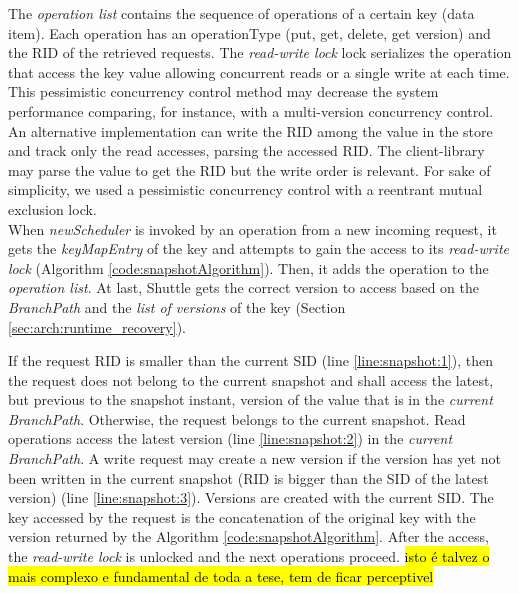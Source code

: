 The \emph{operation list} contains the sequence of operations of a certain key (data item). Each operation has an operationType (put, get, delete, get version) and the \ac{RID} of the retrieved requests. The \emph{read-write lock} lock serializes the operation that access the key value allowing concurrent reads or a single write at each time. This pessimistic concurrency control method may decrease the system performance comparing, for instance, with a multi-version concurrency control. An alternative implementation can write the \ac{RID} among the value in the store and track only the read accesses, parsing the accessed \ac{RID}. The client-library may parse the value to get the \ac{RID} but the write order is relevant. For sake of simplicity, we used a pessimistic concurrency control with a reentrant mutual exclusion lock.\\

When \emph{newScheduler} is invoked by an operation from a new incoming request, it gets the \emph{keyMapEntry} of the key and attempts to gain the access to its \emph{read-write lock} (Algorithm \ref{code:snapshotAlgorithm}). Then, it adds the operation to the \emph{operation list}. At last, Shuttle gets the correct version to access based on the \emph{BranchPath} and the \emph{list of versions} of the key (Section \ref{sec:arch:runtime_recovery}). 

If the request \ac{RID} is smaller than the current \acf{SID} (line \ref{line:snapshot:1}), then the request does not belong to the current snapshot and shall access the latest, but previous to the snapshot instant, version of the value that is in the  \textit{current BranchPath}. Otherwise, the request belongs to the current snapshot. Read operations access the latest version (line \ref{line:snapshot:2}) in the  \textit{current BranchPath}. A write request may create a new version if the version has yet not been written in the current snapshot (\ac{RID} is bigger than the \ac{SID} of the latest version) (line \ref{line:snapshot:3}). Versions are created with the current \acf{SID}. The key accessed by the request is the concatenation of the original key with the version returned by the Algorithm \ref{code:snapshotAlgorithm}. After the access, the \emph{read-write lock} is unlocked and the next operations proceed. \hl{isto é talvez o mais complexo e fundamental de toda a tese, tem de ficar perceptivel}


